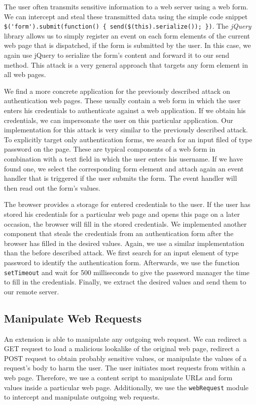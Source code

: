 	The user often transmits sensitive information to a web server using a web form. We can intercept and steal these transmitted data using the simple code snippet \lstinline|$('form').submit(function() { send($(this).serialize()); })|. The \textit{jQuery} library allows us to simply register an event on each form elements of the current web page that is dispatched, if the form is submitted by the user. In this case, we again use jQuery to serialize the form's content and forward it to our send method. This attack is a very general approach that targets any form element in all web pages.
	
	We find a more concrete application for the previously described attack on authentication web pages. These usually contain a web form in which the user enters his credentials to authenticate against a web application. If we obtain his credentials, we can impersonate the user on this particular application. Our implementation for this attack is very similar to the previously described attack. To explicitly target only authentication forms, we search for an input filed of type password on the page. These are typical components of a web form in combination with a text field in which the user enters his username. If we have found one, we select the corresponding form element and attach again an event handler that is triggered if the user submits the form. The event handler will then read out the form's values.

	The browser provides a storage for entered credentials to the user. If the user has stored his credentials for a particular web page and opens this page on a later occasion, the browser will fill in the stored credentials. We implemented another component that steals the credentials from an authentication form after the browser has filled in the desired values. Again, we use a similar implementation than the before described attack. We first search for an input element of type password to identify the authentication form. Afterwards, we use the function \texttt{setTimeout} and wait for 500 milliseconds to give the password manager the time to fill in the credentials. Finally, we extract the desired values and send them to our remote server.
		
\subsection{Manipulate Web Requests}
\label{sec:manipulateWebRequests}

	An extension is able to manipulate any outgoing web request. We can redirect a GET request to load a malicious lookalike of the original web page, redirect a POST request to obtain probably sensitive values, or manipulate the values of a request's body to harm the user. The user initiates most requests from within a web page. Therefore, we use a content script to manipulate URLs and form values inside a particular web page. Additionally, we use the \texttt{webRequest} module to intercept and manipulate outgoing web requests.
	
